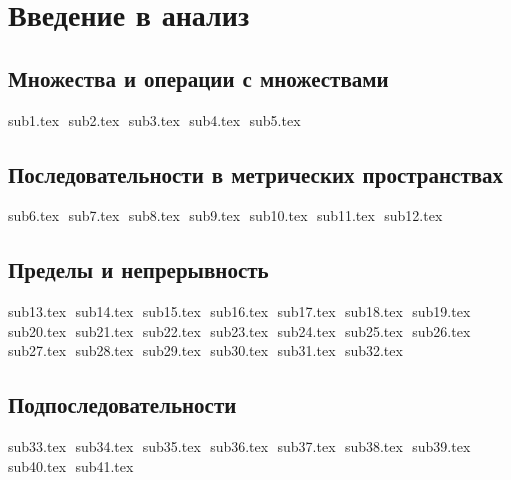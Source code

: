 \chapter{Введение в анализ}
\section{Множества и операции с множествами}
{sub1.tex}
$ $
{sub2.tex}
$ $
{sub3.tex}
$ $
{sub4.tex}
$ $
{sub5.tex}
$ $

\section{Последовательности в метрических пространствах}
{sub6.tex}
$ $
{sub7.tex}
$ $
{sub8.tex}
$ $
{sub9.tex}
$ $
{sub10.tex}
$ $
{sub11.tex}
$ $
{sub12.tex}
$ $

\section{Пределы и непрерывность}
{sub13.tex}
$ $
{sub14.tex}
$ $
{sub15.tex}
$ $
{sub16.tex}
$ $
{sub17.tex}
$ $
{sub18.tex}
$ $
{sub19.tex}
$ $
{sub20.tex}
$ $
{sub21.tex}
$ $
{sub22.tex}
$ $
{sub23.tex}
$ $
{sub24.tex}
$ $
{sub25.tex}
$ $
{sub26.tex}
$ $
{sub27.tex}
$ $
{sub28.tex}
$ $
{sub29.tex}
$ $
{sub30.tex}
$ $
{sub31.tex}
$ $
{sub32.tex}
$ $

\section{Подпоследовательности}
{sub33.tex}
$ $
{sub34.tex}
$ $
{sub35.tex}
$ $
{sub36.tex}
$ $
{sub37.tex}
$ $
{sub38.tex}
$ $
{sub39.tex}
$ $
{sub40.tex}
$ $
{sub41.tex}
$ $
